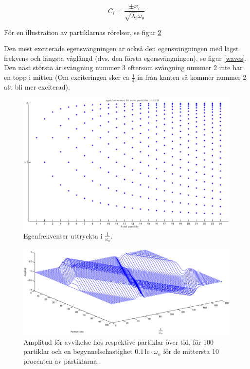 \documentclass[12pt,a4paper]{article}
\newcommand{\captiona}[1]{\caption{\scriptsize{#1}}}
\begin{document}
		\vspace{-8pt}
		
		\begin{equation*}
			C_i = \frac{\pm \dot{x}_i}{\sqrt{\lambda_i} \omega_o}
		\end{equation*}
		
		\vspace{-4pt}
		
		För en illustration av partiklarnas rörelser, se figur \ref{oscot}
		
		Den mest exciterade egensvängningen är också den egensvängningen med lägst frekvens och längsta våglängd
		(dvs. den första egensvängningen), se figur \ref{waves}. Den näst största är svängning nummer 3 eftersom
		svängning nummer 2 inte har en topp i mitten (Om exciteringen sker ca $\frac{1}{4}$ in från kanten så
		kommer nummer 2 att bli mer exciterad).
		
		\vspace{-12pt}
		
		\begin{figure}[h]
			\includegraphics[width=1\textwidth]{egenfrekvenser.eps}
			\vspace{-36pt}
			\captiona{Egenfrekvenser uttryckta i $\frac{1}{\omega_o}$.}
			\label{egenf}
		\end{figure}
		
		\begin{figure}[h]
			\includegraphics[width=1\textwidth]{oscillations-over-time.eps}
			\vspace{-24pt}
			\captiona{Amplitud för avvikelse hos respektive partiklar över tid, för 100 partiklar och en
			begynnelsehastighet $0.1 \, \mathrm{le} \cdot \omega_o$ för de mittersta 10 procenten av partiklarna.}
			\label{oscot}
		\end{figure}
		
\end{document}
